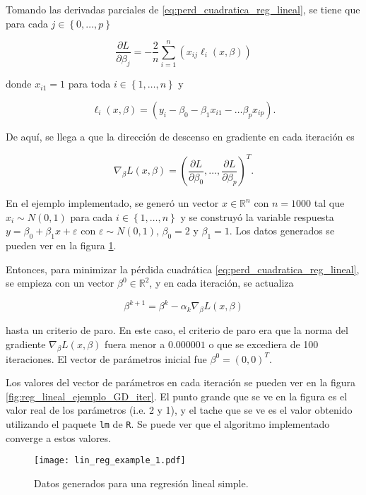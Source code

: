 Tomando las derivadas parciales de \ref{eq:perd_cuadratica_reg_lineal}, se tiene que para cada $j \in \left\{0, \hdots, p \right\}$

\begin{equation}
  \frac{\partial L}{\partial \beta_j} = 
    -\frac{2}{n} \sum_{i = 1}^n \left( x_{ij} \ell_i(x, \beta) \right)
\end{equation}

donde $x_{i1} = 1$ para toda $i \in \left\{1, \hdots, n \right\}$ y

$$
  \ell_i(x, \beta) = \left( y_i - \beta_0 - \beta_1 x_{i1} - \hdots  \beta_p x_{ip} \right).
$$

De aquí, se llega a que la dirección de descenso en gradiente en cada iteración es

$$
  \nabla_{\beta} L(x, \beta) = \left( \frac{\partial L}{\partial \beta_0}, \hdots, \frac{\partial L}{\partial \beta_p} \right)^T.
$$

En el ejemplo implementado, se generó un vector $x \in \mathbb{R}^n$ con $n = 1000$ tal que $x_i \sim N(0, 1)$ para cada $i \in \left\{1, \hdots, n \right\}$ y se construyó la variable respuesta $y = \beta_0 + \beta_1x + \varepsilon$ con $\varepsilon \sim N(0, 1)$, $\beta_0 = 2$ y $\beta_1 = 1$. Los datos generados se pueden ver en la figura \ref{fig:reg_lineal_ejemplo}.

Entonces, para minimizar la pérdida cuadrática \ref{eq:perd_cuadratica_reg_lineal}, se empieza con un vector $\beta^0 \in \mathbb{R}^2$, y en cada iteración, se actualiza 

$$
  \beta^{k+1} = \beta^k - \alpha_k \nabla_{\beta} L(x, \beta)
$$

hasta un criterio de paro. En este caso, el criterio de paro era que la norma del gradiente $\nabla_{\beta} L(x, \beta)$ fuera menor a $0.000001$ o que se excediera de 100 iteraciones. El vector de parámetros inicial fue $\beta^0 = (0, 0)^T$. 

Los valores del vector de parámetros en cada iteración se pueden ver en la figura \ref{fig:reg_lineal_ejemplo_GD_iter}. El punto grande que se ve en la figura es el valor real de los parámetros (i.e. 2 y 1), y el tache que se ve es el valor obtenido utilizando el paquete \texttt{lm} de \texttt{R}. Se puede ver que el algoritmo implementado converge a estos valores.


\begin{figure}[H]
  \centering
  \texttt{[image: lin\_reg\_example\_1.pdf]}
  \caption{Datos generados para una regresión lineal simple.}
  \label{fig:reg_lineal_ejemplo}
\end{figure}

